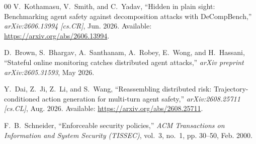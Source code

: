 \documentclass[conference]{IEEEtran}
\begin{document}
\begin{thebibliography}{00}
V.~Kothamasu, V.~Smith, and C.~Yadav, ``Hidden in plain sight: Benchmarking agent safety against decomposition attacks with DeCompBench,'' \emph{arXiv:2606.13994 [cs.CR]}, Jun. 2026. Available: \url{https://arxiv.org/abs/2606.13994}.

D.~Brown, S.~Bhargav, A.~Santhanam, A.~Robey, E.~Wong, and H.~Hassani, ``Stateful online monitoring catches distributed agent attacks,'' \emph{arXiv preprint arXiv:2605.31593}, May 2026.

Y.~Dai, Z.~Ji, Z.~Li, and S.~Wang, ``Reassembling distributed risk: Trajectory-conditioned action generation for multi-turn agent safety,'' \emph{arXiv:2608.25711 [cs.CL]}, Aug. 2026. Available: \url{https://arxiv.org/abs/2608.25711}.

F.~B.~Schneider, ``Enforceable security policies,'' \emph{ACM Transactions on Information and System Security (TISSEC)}, vol.~3, no.~1, pp. 30--50, Feb. 2000.

\end{thebibliography}
\end{document}
